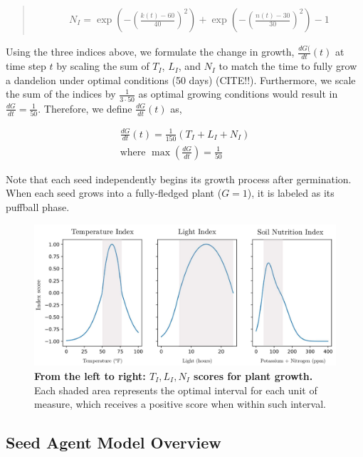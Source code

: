 \begin{quote}
\begin{align}
    N_I = \exp\left(-\left(\frac{k(t)-60}{40}\right)^2\right) + \exp\left(-\left(\frac{n(t)-30}{30}\right)^2\right) - 1
\end{align}
\end{quote}


Using the three indices above, we  formulate the change in growth, \(\frac{dG(}{dt}(t)\) at time step \(t\) by scaling the sum of \(T_I\), \(L_I\), and \(N_I\) to match the time to fully grow a dandelion under optimal conditions (50 days) (CITE!!). Furthermore, we scale the sum of the indices by \(\frac{1}{3\cdot50}\) as optimal growing conditions would result in \(\frac{dG}{dt} = \frac{1}{50}\). Therefore, we define \(\frac{dG}{dt}(t)\) as,

\begin{align}
    \frac{dG}{dt}(t) = \frac{1}{150}\left(T_I+L_I+N_I\right) \\
    \text{where } \max\left(\frac{dG}{dt}\right) = \frac{1}{50} \nonumber
\end{align}


Note that each seed independently begins its growth process after germination. When each seed grows into a fully-fledged plant (\(G = 1\)), it is labeled as its puffball phase. 


\begin{figure}[h!]
\centering
    \includegraphics[scale=0.5]{figures/scoreindex.pdf}
    \captionsetup{width=0.9\textwidth}
    \caption{\textbf{From the left to right: \(T_I, L_I, N_I\) scores for plant growth.} Each shaded area represents the optimal interval for each unit of measure, which receives a positive score when within such interval.}
    \label{fig:indexscoregraphs}
\end{figure}

\subsection{Seed Agent Model Overview}

